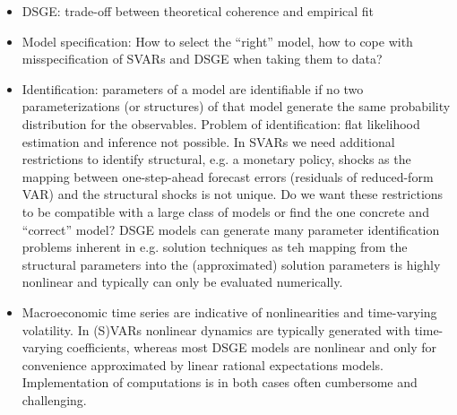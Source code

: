 \begin{solution}
\begin{itemize}
\begin{itemize}
                  \item DSGE: trade-off between theoretical coherence and empirical fit

                  \item Model specification: How to select the \enquote{right} model, how to cope with misspecification of SVARs and DSGE when taking them to data?

                  \item Identification: parameters of a model are identifiable if no two parameterizations (or structures) of that model generate the same probability distribution for the observables. Problem of identification: flat likelihood estimation and inference not possible. In SVARs we need additional restrictions to identify structural, e.g. a monetary policy, shocks as the mapping between one-step-ahead forecast errors (residuals of reduced-form VAR) and the structural shocks is not unique. Do we want these restrictions to be compatible with a large class of models or find the one concrete and \enquote{correct} model? DSGE models can generate many parameter identification problems inherent in e.g. solution techniques as teh mapping from the structural parameters into the (approximated) solution parameters is highly nonlinear and typically can only be evaluated numerically.

                  \item Macroeconomic time series are indicative of nonlinearities and time-varying volatility. In (S)VARs nonlinear dynamics are typically generated with time-varying coefficients, whereas most DSGE models are nonlinear and only for convenience approximated by linear rational expectations models. Implementation of computations is in both cases often cumbersome and challenging.
              \end{itemize}
    \end{itemize}
\end{solution}

